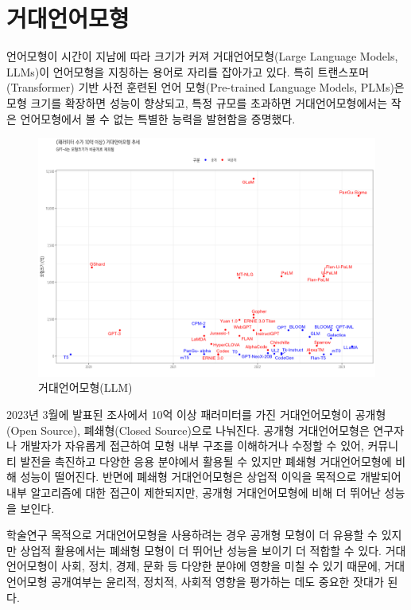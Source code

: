 \documentclass[
  letterpaper,
]{book}
\begin{document}
\hypertarget{uxac70uxb300uxc5b8uxc5b4uxbaa8uxd615}{%
\section{거대언어모형}\label{uxac70uxb300uxc5b8uxc5b4uxbaa8uxd615}}

언어모형이 시간이 지남에 따라 크기가 커져 거대언어모형(Large Language
Models, LLMs)이 언어모형을 지칭하는 용어로 자리를 잡아가고 있다. 특히
트랜스포머(Transformer) 기반 사전 훈련된 언어 모형(Pre-trained Language
Models, PLMs)은 모형 크기를 확장하면 성능이 향상되고, 특정 규모를
초과하면 거대언어모형에서는 작은 언어모형에서 볼 수 없는 특별한 능력을
발현함을 증명했다. \autocite{zhao2023survey}

\begin{figure}

{\centering \includegraphics{images/llm_g.png}

}

\caption{거대언어모형(LLM)}

\end{figure}

2023년 3월에 발표된 조사에서 10억 이상 패러미터를 가진 거대언어모형이
공개형(Open Source), 폐쇄형(Closed Source)으로 나눠진다. 공개형
거대언어모형은 연구자나 개발자가 자유롭게 접근하여 모형 내부 구조를
이해하거나 수정할 수 있어, 커뮤니티 발전을 촉진하고 다양한 응용 분야에서
활용될 수 있지만 폐쇄형 거대언어모형에 비해 성능이 떨어진다. 반면에
폐쇄형 거대언어모형은 상업적 이익을 목적으로 개발되어 내부 알고리즘에
대한 접근이 제한되지만, 공개형 거대언어모형에 비해 더 뛰어난 성능을
보인다.

학술연구 목적으로 거대언어모형을 사용하려는 경우 공개형 모형이 더 유용할
수 있지만 상업적 활용에서는 폐쇄형 모형이 더 뛰어난 성능을 보이기 더
적합할 수 있다. 거대언어모형이 사회, 정치, 경제, 문화 등 다양한 분야에
영향을 미칠 수 있기 때문에, 거대언어모형 공개여부는 윤리적, 정치적,
사회적 영향을 평가하는 데도 중요한 잣대가 된다.
\end{document}
